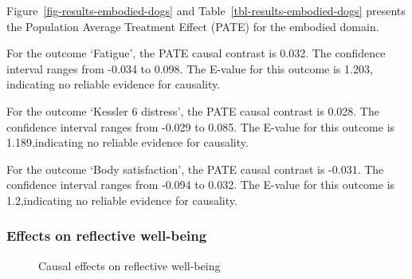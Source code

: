 \documentclass[
  singlecolumn,
  9pt]{article}
\begin{document}
Figure~\ref{fig-results-embodied-dogs} and
Table~\ref{tbl-results-embodied-dogs} presents the Population Average
Treatment Effect (PATE) for the embodied domain.

For the outcome `Fatigue', the PATE causal contrast is 0.032. The
confidence interval ranges from -0.034 to 0.098. The E-value for this
outcome is 1.203, indicating no reliable evidence for causality.

For the outcome `Kessler 6 distress', the PATE causal contrast is 0.028.
The confidence interval ranges from -0.029 to 0.085. The E-value for
this outcome is 1.189,indicating no reliable evidence for causality.

For the outcome `Body satisfaction', the PATE causal contrast is -0.031.
The confidence interval ranges from -0.094 to 0.032. The E-value for
this outcome is 1.2,indicating no reliable evidence for causality.

\newpage{}

\subsubsection{Effects on reflective
well-being}\label{effects-on-reflective-well-being-1}

\begin{figure}


\caption{\label{fig-results-reflective-well-being-dogs}Causal effects on
reflective well-being}

\end{figure}%

\newpage{}
\end{document}
